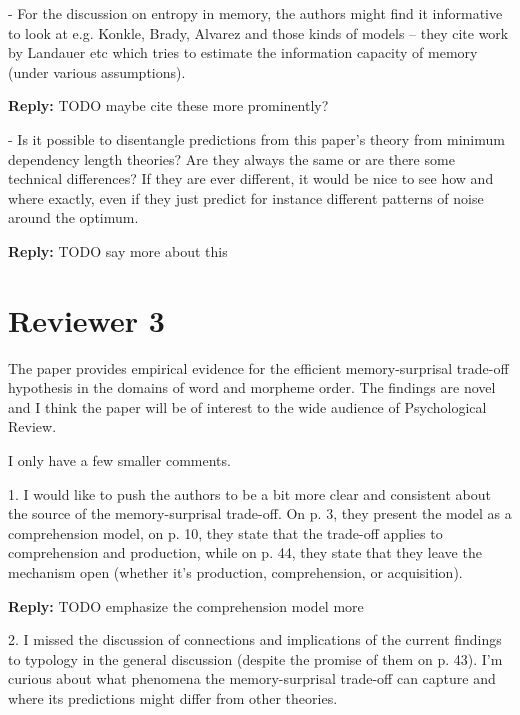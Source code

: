 \documentclass{article}[11pt,a4paper,oneside]
\newenvironment{reply}
  {\par\medskip
   \color{blue}%
   \begin{framed}
   \textbf{Reply: }\ignorespaces}
 {\end{framed}
  \medskip}
\begin{document}
- For the discussion on entropy in memory, the authors might find it informative to look at e.g. Konkle, Brady, Alvarez and those kinds of models -- they cite work by Landauer etc which tries to estimate the information capacity of memory (under various assumptions).

\begin{reply}
	TODO maybe cite these more prominently?
\end{reply}

- Is it possible to disentangle predictions from this paper's theory from minimum dependency length theories? Are they always the same or are there some technical differences? If they are ever different, it would be nice to see how and where exactly, even if they just predict for instance different patterns of noise around the optimum.


\begin{reply}
	TODO say more about this
\end{reply}



\section{Reviewer 3}

The paper provides empirical evidence for the efficient memory-surprisal trade-off hypothesis in the domains of word and morpheme order. The findings are novel and I think the paper will be of interest to the wide audience of Psychological Review.

I only have a few smaller comments.

1. I would like to push the authors to be a bit more clear and consistent about the source of the memory-surprisal trade-off. On p. 3, they present the model as a comprehension model, on p. 10, they state that the trade-off applies to comprehension and production, while on p. 44, they state that they leave the mechanism open (whether it's production, comprehension, or acquisition).

\begin{reply}
	TODO emphasize the comprehension model more
\end{reply}

2. I missed the discussion of connections and implications of the current findings to typology in the general discussion (despite the promise of them on p. 43). I'm curious about what phenomena the memory-surprisal trade-off can capture and where its predictions might differ from other theories.
\end{document}
